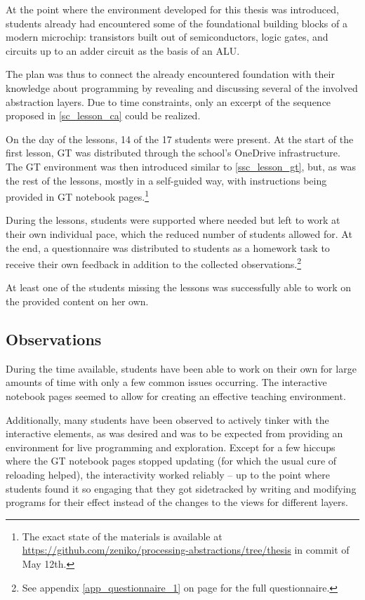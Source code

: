 At the point where the environment developed for this thesis was introduced, students already had encountered some of the foundational building blocks of a modern microchip: transistors built out of semiconductors, logic gates, and circuits up to an adder circuit as the basis of an \ac{ALU}.

The plan was thus to connect the already encountered foundation with their knowledge about programming by revealing and discussing several of the involved abstraction layers. Due to time constraints, only an excerpt of the sequence proposed in \ref{sc_lesson_ca} could be realized.

On the day of the lessons, 14 of the 17 students were present. At the start of the first lesson, \ac{GT} was distributed through the school's OneDrive infrastructure. The \ac{GT} environment was then introduced similar to \ref{ssc_lesson_gt}, but, as was the rest of the lessons, mostly in a self-guided way, with instructions being provided in \ac{GT} notebook pages.\footnote{The exact state of the materials is available at \url{https://github.com/zeniko/processing-abstractions/tree/thesis} in commit  of May 12th.}

During the lessons, students were supported where needed but left to work at their own individual pace, which the reduced number of students allowed for. At the end, a questionnaire was distributed to students as a homework task to receive their own feedback in addition to the collected observations.\footnote{See appendix \ref{app_questionnaire_1} on page \pageref{app_questionnaire_1} for the full questionnaire.}

At least one of the students missing the lessons was successfully able to work on the provided content on her own.


\subsection{Observations}

During the time available, students have been able to work on their own for large amounts of time with only a few common issues occurring. The interactive notebook pages seemed to allow for creating an effective teaching environment.

Additionally, many students have been observed to actively tinker with the interactive elements, as was desired and was to be expected from providing an environment for live programming and exploration. Except for a few hiccups where the \ac{GT} notebook pages stopped updating (for which the usual cure of reloading helped), the interactivity worked reliably -- up to the point where students found it so engaging that they got sidetracked by writing and modifying programs for their effect instead of the changes to the views for different layers.

